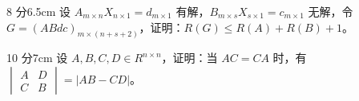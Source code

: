 \begin{problem}{8 分}{6.5cm}
设 $A_{m\times n}X_{n\times 1}=d_{m\times 1}$ 有解，$B_{m\times s}X_{s\times 1}=c_{m\times 1}$ 无解，令 $G=(ABdc)_{m\times(n+s+2)}$，证明：$R(G)\le R(A)+R(B)+1$。
\end{problem}

\begin{problem}{10 分}{7cm}
设 $A,B,C,D\in R^{n\times n}$，证明：当 $AC=CA$ 时，有
$\begin{vmatrix}A&D\\C&B\end{vmatrix}=|AB-CD|$。
\end{problem}
